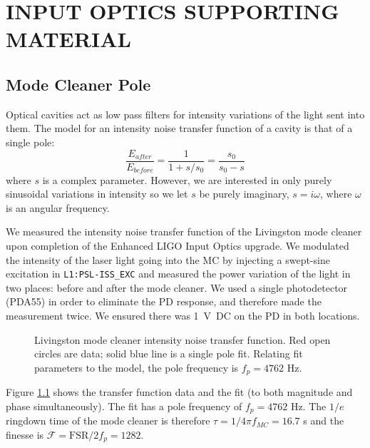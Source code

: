 \chapter{INPUT OPTICS SUPPORTING MATERIAL}



\section{Mode Cleaner Pole}
\label{sec:MCpole}
Optical cavities act as low pass filters for intensity variations of
the light sent into them. The model for an intensity noise transfer
function of a cavity is that of a single pole:
\begin{equation}
\frac{E_{after}}{E_{before}} = \frac{1}{1 + s/s_0} = \frac{s_0}{s_0 - s}
\end{equation}
where $s$ is a complex parameter. However, we are interested in only
purely sinusoidal variations in intensity so we let $s$ be purely
imaginary, $s=i\omega$, where $\omega$ is an angular frequency.

We measured the intensity noise transfer function of the Livingston
mode cleaner upon completion of the Enhanced LIGO Input Optics
upgrade. We modulated the intensity of the laser light going into the
MC by injecting a swept-sine excitation in \texttt{L1:PSL-ISS\_EXC}
and measured the power variation of the light in two places: before
and after the mode cleaner. We used a single photodetector (PDA55) in
order to eliminate the PD response, and therefore made the measurement
twice. We ensured there was 1~V~DC on the PD in both locations.

\begin{figure}
\begin{centering}
\caption[Livingston mode cleaner intensity noise transfer
function]{Livingston mode cleaner intensity noise transfer
  function. Red open circles are data; solid blue line is a single
  pole fit. Relating fit parameters to the model, the pole frequency
  is $f_p=4762$ Hz.}
\label{fig:mcpole}
\end{centering}
\end{figure}

Figure \ref{fig:mcpole} shows the transfer function data and the fit
(to both magnitude and phase simultaneously). The fit has a pole
frequency of $f_p=4762$ Hz. The $1/e$ ringdown time of the mode
cleaner is therefore $\tau = 1/4\pi f_{MC} = 16.7$ \micro s and the
finesse is $\mathcal{F} = \mathrm{FSR}/2f_p = 1282$.





